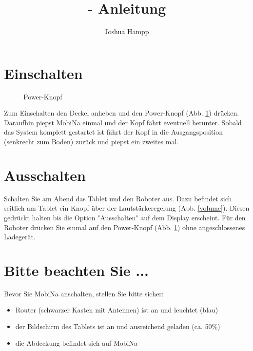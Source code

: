 \documentclass[11pt]{article} %
\title{\mb{} - Anleitung}
\author{Joshua Hampp}
\newcommand{\mb}{MobiNa}
\begin{document}
\maketitle

\section{Einschalten}

\begin{figure}[h]
\centering
{}
	\caption{Power-Knopf}
	\label{turn_on}
\end{figure}

Zum Einschalten den Deckel anheben und den Power-Knopf (Abb. \ref{turn_on}) drücken.
Daraufhin piepst \mb{} einmal und der Kopf fährt eventuell herunter.
Sobald das System komplett gestartet ist fährt der Kopf in die Ausgangsposition (senkrecht zum Boden) zurück und piepst ein zweites mal.

\section{Ausschalten}

Schalten Sie am Abend das Tablet und den Roboter aus.
Dazu befindet sich seitlich am Tablet ein Knopf über der Lautstärkeregelung (Abb. \ref{volume}). Diesen gedrückt halten bis die Option "Ausschalten" auf dem Display erscheint.
Für den Roboter drücken Sie einmal auf den Power-Knopf (Abb. \ref{turn_on}) ohne angeschlossenes Ladegerät.

\section{Bitte beachten Sie ...}

Bevor Sie \mb{} anschalten, stellen Sie bitte sicher:
\begin{itemize}
	\item Router (schwarzer Kasten mit Antennen) ist an und leuchtet (blau)
	\item der Bildschirm des Tablets ist an und ausreichend geladen (ca. 50\%)
	\item die Abdeckung befindet sich auf \mb{}
\end{itemize}
\end{document}
